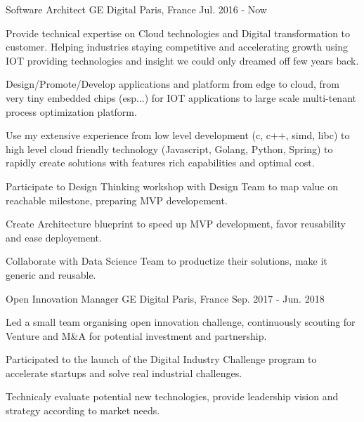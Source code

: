 

\begin{cventries}

  \cventry
    {Software Architect} %
    {GE Digital} %
    {Paris, France} %
    {Jul. 2016 - Now} %
    {
      \begin{cvitems} %
        \item {Provide technical expertise on Cloud technologies and Digital transformation to customer. Helping industries staying competitive and accelerating growth using IOT providing technologies and insight we could only dreamed off few years back.}
        \item {Design/Promote/Develop applications and platform from edge to cloud, from very tiny embedded chips (esp...) for IOT applications to large scale multi-tenant process optimization platform.}
        \item {Use my extensive experience from low level development (c, c++, simd, libc) to high level cloud friendly technology (Javascript, Golang, Python, Spring) to rapidly create solutions with features rich capabilities and optimal cost.}
        \item {Participate to Design Thinking workshop with Design Team to map value on reachable milestone, preparing MVP developement.}
        \item {Create Architecture blueprint to speed up MVP development, favor reusability and ease deployement. }
        \item {Collaborate with Data Science Team to productize their solutions, make it generic and reusable.}
      \end{cvitems}
    }


  \cventry
    {Open Innovation Manager} %
    {GE Digital} %
    {Paris, France} %
    {Sep. 2017 - Jun. 2018} %
    {
      \begin{cvitems} %
        \item {Led a small team organising open innovation challenge, continuously scouting for Venture and M\&A for potential investment and partnership.}
        \item {Participated to the launch of the Digital Industry Challenge program to accelerate startups and solve real industrial challenges.}
        \item {Technicaly evaluate potential new technologies, provide leadership vision and strategy according to market needs.}
      \end{cvitems}
    }


\end{cventries}
